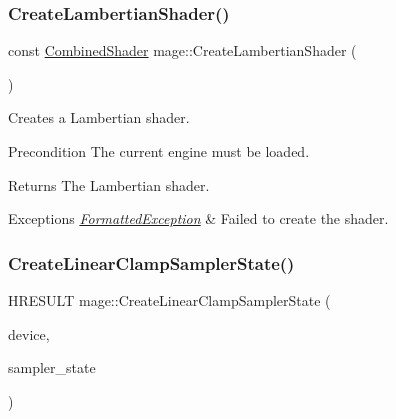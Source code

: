 \subsubsection{\texorpdfstring{Create\+Lambertian\+Shader()}{CreateLambertianShader()}}
{\footnotesize\ttfamily const \hyperlink{structmage_1_1_combined_shader}{Combined\+Shader} mage\+::\+Create\+Lambertian\+Shader (\begin{DoxyParamCaption}{ }\end{DoxyParamCaption})}

Creates a Lambertian shader.

\begin{DoxyPrecond}{Precondition}
The current engine must be loaded. 
\end{DoxyPrecond}
\begin{DoxyReturn}{Returns}
The Lambertian shader. 
\end{DoxyReturn}

\begin{DoxyExceptions}{Exceptions}
{\em \hyperlink{structmage_1_1_formatted_exception}{Formatted\+Exception}} & Failed to create the shader. \\
\hline
\end{DoxyExceptions}
\hypertarget{namespacemage_aa8f37da8dc3c10b5e4e1cd56be94ff95}{}\label{namespacemage_aa8f37da8dc3c10b5e4e1cd56be94ff95} 
\subsubsection{\texorpdfstring{Create\+Linear\+Clamp\+Sampler\+State()}{CreateLinearClampSamplerState()}}
{\footnotesize\ttfamily H\+R\+E\+S\+U\+LT mage\+::\+Create\+Linear\+Clamp\+Sampler\+State (\begin{DoxyParamCaption}\item[{I\+D3\+D11\+Device2 $\ast$}]{device,  }\item[{I\+D3\+D11\+Sampler\+State $\ast$$\ast$}]{sampler\+\_\+state }\end{DoxyParamCaption})}

\hypertarget{namespacemage_a714981745a2e53e5c55b04c4441bd2d0}{}\label{namespacemage_a714981745a2e53e5c55b04c4441bd2d0} 

